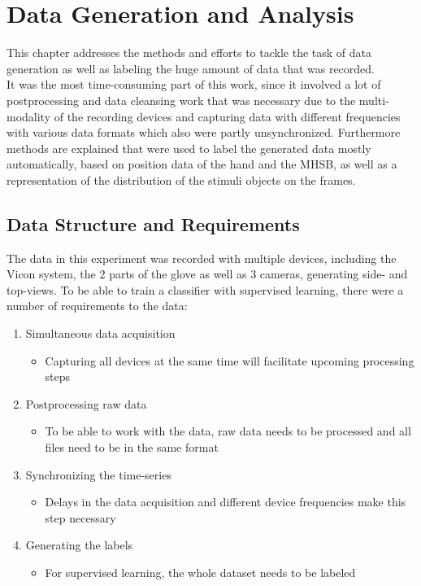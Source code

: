 
\chapter{Data Generation and Analysis} %

\label{Data} %
This chapter addresses the methods and efforts to tackle the task of data generation as well as labeling the huge amount of data that was recorded.\\
It was the most time-consuming part of this work, since it involved a lot of postprocessing and data cleansing work that was necessary due to the multi-modality of the recording devices and capturing data with different frequencies with various data formats which also were partly unsynchronized. Furthermore methods are explained that were used to label the generated data mostly automatically, based on position data of the hand and the MHSB, as well as a representation of the distribution of the stimuli objects on the frames.

\section{Data Structure and Requirements}
The data in this experiment was recorded with multiple devices, including the Vicon system, the 2 parts of the glove as well as 3 cameras, generating side- and top-views. To be able to train a classifier with supervised learning, there were a number of requirements to the data:
\begin{enumerate}
\item Simultaneous data acquisition
\begin{itemize}
\item Capturing all devices at the same time will facilitate upcoming processing steps
\end{itemize}
\item Postprocessing raw data
\begin{itemize}
\item To be able to work with the data, raw data needs to be processed and all files need to be in the same format
\end{itemize}
\item Synchronizing the time-series
\begin{itemize}
\item Delays in the data acquisition and different device frequencies make this step necessary
\end{itemize}
\item Generating the labels
\begin{itemize}
\item For supervised learning, the whole dataset needs to be labeled
\end{itemize}
\end{enumerate}
